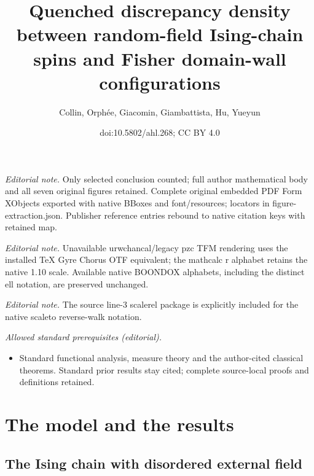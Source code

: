 \documentclass[10pt]{amsart}
\title{Quenched discrepancy density between random-field Ising-chain spins and Fisher domain-wall configurations}
\author{Collin, Orphée, Giacomin, Giambattista, Hu, Yueyun}
\date{doi:10.5802/ahl.268; CC BY 4.0}
\theoremstyle{definition}\newtheorem{defi}[theo]{Definition}\newtheorem{rema}[theo]{Remark}\newtheorem{exam}[theo]{Example}\newtheorem{exem}[theo]{Example}\newtheorem{nota}[theo]{Notation}
\begin{document}
\maketitle
\noindent\textit{Editorial note.} Only selected conclusion counted; full author mathematical body and all seven original figures retained. Complete original embedded PDF Form XObjects exported with native BBoxes and font/resources; locators in figure-extraction.json. Publisher reference entries rebound to native citation keys with retained map.\par\medskip
\noindent\textit{Editorial note.} Unavailable urwchancal/legacy pzc TFM rendering uses the installed TeX Gyre Chorus OTF equivalent; the mathcalc r alphabet retains the native 1.10 scale. Available native BOONDOX alphabets, including the distinct ell notation, are preserved unchanged.\par\medskip
\noindent\textit{Editorial note.} The source line-3 scalerel package is explicitly included for the native scaleto reverse-walk notation.\par\medskip
\noindent\textit{Allowed standard prerequisites (editorial).}\begin{itemize}
\item Standard functional analysis, measure theory and the author-cited classical theorems. Standard prior results stay cited; complete source-local proofs and definitions retained.
\end{itemize}\medskip


\section{The model and the results}\label{sec:intro}

\subsection{The Ising chain with disordered external field}\label{sec:model}
\end{document}
